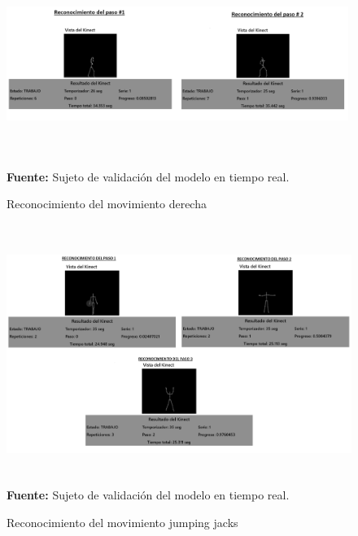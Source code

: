 \begin{figure}[H]
	\caption{Reconocimiento del movimiento derecha}
	\label{fig:recognitionTenis}
	\centering
	\includegraphics[width=420px,height=250px]{graphics/resultados/recognitionTennis.png} \\
	\textbf{Fuente:} Sujeto de validaci\'on del modelo en tiempo real.
\end{figure}
\begin{figure}[H]
	\caption{Reconocimiento del movimiento jumping jacks}
	\label{fig:recognitionCheerleader}
	\centering
	\includegraphics[width=430px,height=320px]{graphics/resultados/recognitionCheerleader.png} \\
	\textbf{Fuente:} Sujeto de validaci\'on del modelo en tiempo real.
\end{figure}
